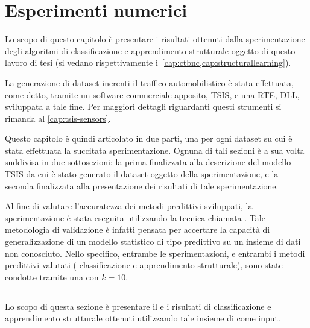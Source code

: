 
\chapter{Esperimenti numerici}\label{cap:esperimenti}
Lo scopo di questo capitolo è presentare i risultati ottenuti dalla sperimentazione degli algoritmi di classificazione e apprendimento strutturale oggetto di questo lavoro di tesi (si vedano rispettivamente i~\vref{cap:ctbnc,cap:structurallearning}). 

La generazione di dataset inerenti il traffico automobilistico è stata effettuata, come detto, tramite un software commerciale apposito, \acs{TSIS}, e una \acl{RTE},  \acs{DLL}, sviluppata a tale fine. Per maggiori dettagli riguardanti questi strumenti si rimanda al \vref{cap:tsis-sensors}.

Questo capitolo è quindi articolato in due parti, una per ogni dataset su cui è stata effettuata la succitata sperimentazione. Ognuna di tali sezioni è a sua volta suddivisa in due sottosezioni: la prima finalizzata alla descrizione del modello \acs{TSIS} da cui è stato generato il dataset oggetto della sperimentazione, e la seconda finalizzata alla presentazione dei risultati di tale sperimentazione.

Al fine di valutare l'accuratezza dei metodi predittivi sviluppati, la sperimentazione è stata eseguita utilizzando la tecnica chiamata \emph{}. Tale metodologia di validazione è infatti pensata per accertare la capacità di generalizzazione di un modello statistico di tipo predittivo su un insieme di dati non conosciuto. Nello specifico, entrambe le sperimentazioni, e entrambi i metodi predittivi valutati (\ie{} classificazione e apprendimento strutturale), sono state condotte tramite una \emph{} \emph{} con $k=10$.

\section{}\label{sec:dataset-1}
Lo scopo di questa sezione è presentare il  e i risultati di classificazione e apprendimento strutturale ottenuti utilizzando tale insieme di \emph{} come input.

